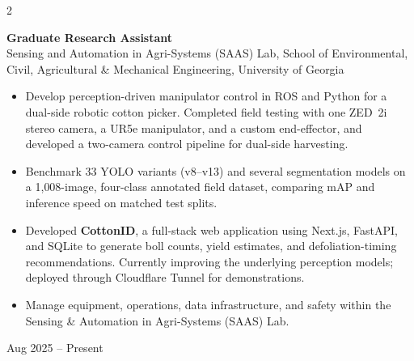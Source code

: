 \documentclass[10pt, letterpaper]{article}
\newenvironment{highlights}{%
    \begin{itemize}[topsep=0.08cm, parsep=0.08cm, partopsep=0pt,
                    itemsep=0pt, leftmargin=0.4cm + 10pt]
}{\end{itemize}}
\newenvironment{twocolentry}[2][]{%
    \onecolentry
    \def\secondColumn{#2}
    \setcolumnwidth{\fill, 4.2cm}
    \begin{paracol}{2}
}{%
    \switchcolumn \raggedleft \secondColumn
    \end{paracol}
    \endonecolentry
}
\begin{document}
\begin{twocolentry}{Aug 2025 -- Present}
    \textbf{Graduate Research Assistant} \\
    Sensing and Automation in Agri-Systems (SAAS) Lab, School of Environmental,
    Civil, Agricultural \& Mechanical Engineering, University of Georgia
    \begin{highlights}
        \item Develop perception-driven manipulator control in ROS and Python for a
              dual-side robotic cotton picker. Completed field testing with one
              ZED~2i stereo camera, a UR5e manipulator, and a custom end-effector,
              and developed a two-camera control pipeline for dual-side harvesting.

        \item Benchmark 33 YOLO variants (v8--v13) and several segmentation models on
              a 1{,}008-image, four-class annotated field dataset, comparing mAP and
              inference speed on matched test splits.

        \item Developed \textbf{CottonID}, a full-stack web application using Next.js,
              FastAPI, and SQLite to generate boll counts, yield estimates, and
              defoliation-timing recommendations. Currently improving the underlying
              perception models; deployed through Cloudflare Tunnel for
              demonstrations.

        \item Manage equipment, operations, data infrastructure, and safety within the
              Sensing \& Automation in Agri-Systems (SAAS) Lab.
    \end{highlights}
    \vspace{0.12cm}
\end{twocolentry}
\end{document}
